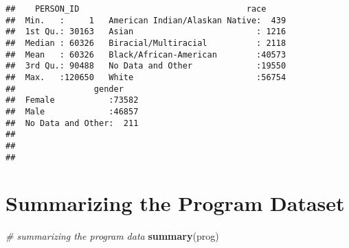 \documentclass[]{article}
\newenvironment{Shaded}{\begin{snugshade}}{\end{snugshade}}
\newcommand{\KeywordTok}[1]{\textcolor[rgb]{0.13,0.29,0.53}{\textbf{#1}}}
\newcommand{\CommentTok}[1]{\textcolor[rgb]{0.56,0.35,0.01}{\textit{#1}}}
\newcommand{\NormalTok}[1]{#1}
\begin{document}
\begin{verbatim}
##    PERSON_ID                                  race      
##  Min.   :     1   American Indian/Alaskan Native:  439  
##  1st Qu.: 30163   Asian                         : 1216  
##  Median : 60326   Biracial/Multiracial          : 2118  
##  Mean   : 60326   Black/African-American        :40573  
##  3rd Qu.: 90488   No Data and Other             :19550  
##  Max.   :120650   White                         :56754  
##                gender     
##  Female           :73582  
##  Male             :46857  
##  No Data and Other:  211  
##                           
##                           
## 
\end{verbatim}

\section{Summarizing the Program
Dataset}\label{summarizing-the-program-dataset}

\begin{Shaded}
\begin{Highlighting}[]
\CommentTok{# summarizing the program data}
\KeywordTok{summary}\NormalTok{(prog)}
\end{Highlighting}
\end{Shaded}
\end{document}
